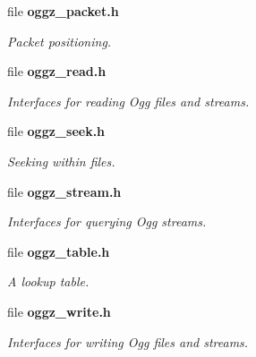 \begin{DoxyCompactItemize}
file {\bf oggz\-\_\-packet.\-h}
\begin{DoxyCompactList}\small\item\em Packet positioning. \end{DoxyCompactList}\item 
file {\bf oggz\-\_\-read.\-h}
\begin{DoxyCompactList}\small\item\em Interfaces for reading Ogg files and streams. \end{DoxyCompactList}\item 
file {\bf oggz\-\_\-seek.\-h}
\begin{DoxyCompactList}\small\item\em Seeking within files. \end{DoxyCompactList}\item 
file {\bf oggz\-\_\-stream.\-h}
\begin{DoxyCompactList}\small\item\em Interfaces for querying Ogg streams. \end{DoxyCompactList}\item 
file {\bf oggz\-\_\-table.\-h}
\begin{DoxyCompactList}\small\item\em A lookup table. \end{DoxyCompactList}\item 
file {\bf oggz\-\_\-write.\-h}
\begin{DoxyCompactList}\small\item\em Interfaces for writing Ogg files and streams. \end{DoxyCompactList}\end{DoxyCompactItemize}
